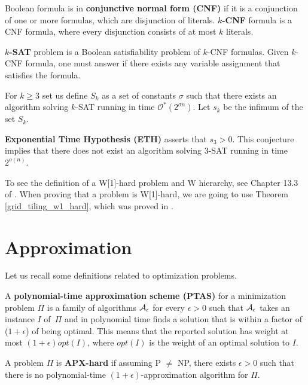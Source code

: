\begin{defi}
\label{definition:cnf}
Boolean formula is in \textbf{conjunctive normal form (CNF)} if
it is a conjunction of one or more formulas,
which are disjunction of literals.
\textbf{$k$-CNF} formula is a CNF formula, where
every disjunction consists of at most $k$ literals.
\end{defi}

\begin{defi}
\textbf{\textsc{$k$-SAT}} problem is 
a Boolean satisfiability problem of $k$-CNF formulas.
Given $k$-CNF formula, one must answer if there
exists any variable assignment that satisfies the formula.
\end{defi}

\begin{defi}
For $k \ge 3$ set us define $S_k$ as a set of constants $\sigma$
such that there exists an algorithm solving \textsc{$k$-SAT} running in time
$\mathcal{O}^{*}(2^{\sigma n})$.
Let $s_k$ be the infimum  of the set $S_k$.

\textbf{Exponential Time Hypothesis (ETH)} asserts
that $s_3 > 0$. This conjecture implies that
there does not exist an algorithm solving \textsc{3-SAT}
running in time $2^{o(n)}$.
\end{defi}

To see the definition of a W[1]-hard problem and W hierarchy,
see Chapter 13.3 of \cite{platypus_book}.
When proving that a problem is W[1]-hard,
we are going to use Theorem 
\ref{grid_tiling_w1_hard}, which was proved in \cite{marx_grid_tiling}.

\section{Approximation}

Let us recall some definitions related to optimization problems.

\begin{defi}
A \textbf{polynomial-time approximation scheme (PTAS)}
for a minimization problem $\Pi$
is a family of algorithms $\cal{A}_\epsilon$ for
every $\epsilon > 0$
such that $\cal{A}_\epsilon$ takes an instance $I$ of~$\Pi$
and in polynomial time
finds a solution that is within a factor
of ($1+\epsilon$) of being optimal.
This means that the reported solution has weight at most
$(1+\epsilon)opt(I)$, where $opt(I)$ is the weight
of an optimal solution to $I$.
\end{defi}

\begin{defi}
A problem $\Pi$ is \textbf{APX-hard} if assuming P $\neq$ NP,
there exists $\epsilon > 0$
such that there is no polynomial-time $(1+\epsilon)$-approximation algorithm
for $\Pi$.
\end{defi}


